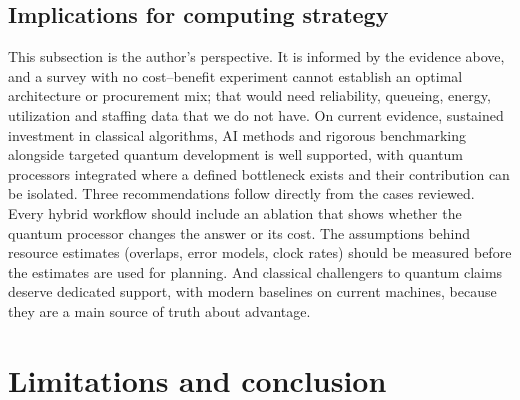\documentclass[10pt,a4paper]{article}
\begin{document}
\subsection{Implications for computing strategy}
\label{sec:strategy}
This subsection is the author's perspective. It is informed by the evidence above, and a survey with no cost--benefit experiment cannot establish an optimal architecture or procurement mix; that would need reliability, queueing, energy, utilization and staffing data that we do not have. On current evidence, sustained investment in classical algorithms, AI methods and rigorous benchmarking alongside targeted quantum development is well supported, with quantum processors integrated where a defined bottleneck exists and their contribution can be isolated. Three recommendations follow directly from the cases reviewed. Every hybrid workflow should include an ablation that shows whether the quantum processor changes the answer or its cost. The assumptions behind resource estimates (overlaps, error models, clock rates) should be measured before the estimates are used for planning. And classical challengers to quantum claims deserve dedicated support, with modern baselines on current machines, because they are a main source of truth about advantage.
\section{Limitations and conclusion}
\label{sec:end}
\end{document}
